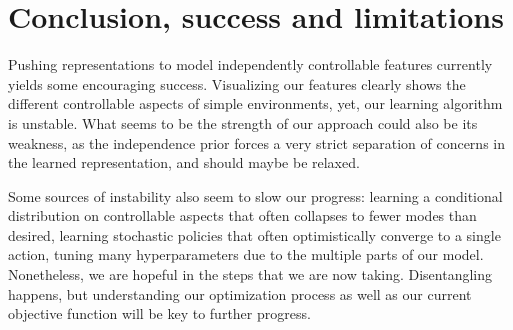 \section{Conclusion, success and limitations}
Pushing representations to model independently controllable features currently yields some encouraging success. Visualizing our features clearly shows the different controllable aspects of simple environments, yet, our learning algorithm is unstable. What seems to be the strength of our approach could also be its weakness, as the independence prior forces a very strict separation of concerns in the learned representation, and should maybe be relaxed.

Some sources of instability also seem to slow our progress: learning a conditional distribution on controllable aspects that often collapses to fewer modes than desired, learning stochastic policies that often optimistically converge to a single action, tuning many hyperparameters due to the multiple parts of our model. Nonetheless, we are hopeful in the steps that we are now taking. Disentangling happens, but understanding our optimization process as well as our current objective function will be key to further progress. 